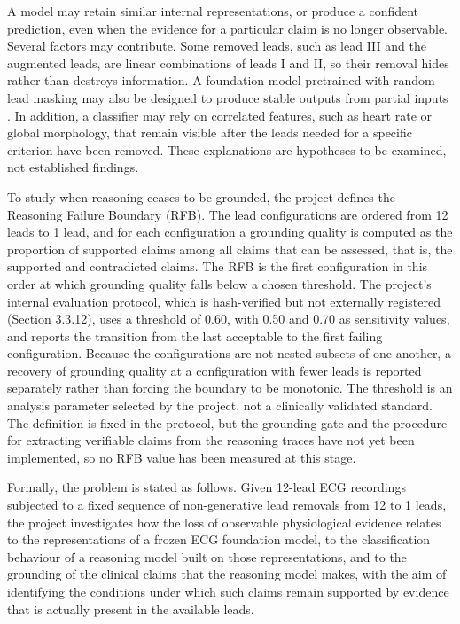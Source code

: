 A model may retain similar internal representations, or produce a confident prediction, even when the evidence for a particular claim is no longer observable. Several factors may contribute. Some removed leads, such as lead III and the augmented leads, are linear combinations of leads I and II, so their removal hides rather than destroys information. A foundation model pretrained with random lead masking may also be designed to produce stable outputs from partial inputs \cite{MCKEEN2025ECGFM,OH2022LEADAGNOSTIC}. In addition, a classifier may rely on correlated features, such as heart rate or global morphology, that remain visible after the leads needed for a specific criterion have been removed. These explanations are hypotheses to be examined, not established findings.

To study when reasoning ceases to be grounded, the project defines the Reasoning Failure Boundary (RFB). The lead configurations are ordered from 12 leads to 1 lead, and for each configuration a grounding quality is computed as the proportion of supported claims among all claims that can be assessed, that is, the supported and contradicted claims. The RFB is the first configuration in this order at which grounding quality falls below a chosen threshold. The project's internal evaluation protocol, which is hash-verified but not externally registered (Section 3.3.12), uses a threshold of 0.60, with 0.50 and 0.70 as sensitivity values, and reports the transition from the last acceptable to the first failing configuration. Because the configurations are not nested subsets of one another, a recovery of grounding quality at a configuration with fewer leads is reported separately rather than forcing the boundary to be monotonic. The threshold is an analysis parameter selected by the project, not a clinically validated standard. The definition is fixed in the protocol, but the grounding gate and the procedure for extracting verifiable claims from the reasoning traces have not yet been implemented, so no RFB value has been measured at this stage.

Formally, the problem is stated as follows. Given 12-lead ECG recordings subjected to a fixed sequence of non-generative lead removals from 12 to 1 leads, the project investigates how the loss of observable physiological evidence relates to the representations of a frozen ECG foundation model, to the classification behaviour of a reasoning model built on those representations, and to the grounding of the clinical claims that the reasoning model makes, with the aim of identifying the conditions under which such claims remain supported by evidence that is actually present in the available leads.

